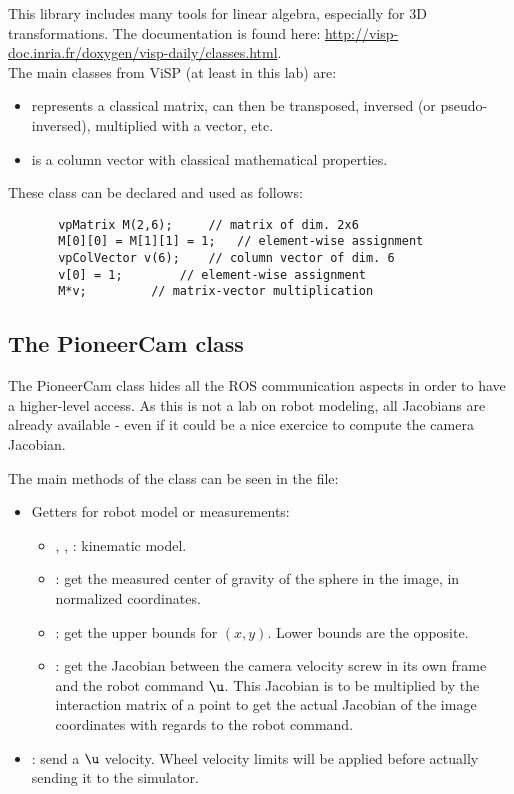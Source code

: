 \documentclass{ecnreport}
\begin{document}
This library includes many tools for linear algebra, especially for 3D transformations. 
The documentation is found here: \url{http://visp-doc.inria.fr/doxygen/visp-daily/classes.html}.\\
The main classes from ViSP (at least in this lab) are:
\begin{itemize}
\item {} represents a classical matrix, can then be transposed, inversed (or pseudo-inversed), multiplied with a vector, etc.
\item {} is a column vector with classical mathematical properties.
\end{itemize}
These class can be declared and used as follows:
\begin{center}\cppstyle
\begin{lstlisting}
       vpMatrix M(2,6); 	// matrix of dim. 2x6
       M[0][0] = M[1][1] = 1;	// element-wise assignment
       vpColVector v(6);	// column vector of dim. 6
       v[0] = 1;		// element-wise assignment
       M*v;			// matrix-vector multiplication
\end{lstlisting}
\end{center}

\subsection{The PioneerCam class}
\label{pioneer}
The PioneerCam class hides all the ROS communication aspects in order to have a higher-level access. As this is not a lab on robot modeling, all Jacobians are already 
available - even if it could be a nice exercice to compute the camera Jacobian. 

The main methods of the  class can be seen in the  file:
\begin{itemize}
 \item Getters for robot model or measurements:
 \begin{itemize}
  \item {}, ,  : kinematic model.
  \item {}: get the measured center of gravity of the sphere in the image, in normalized coordinates.
  \item {}: get the upper bounds for $(x,y)$. Lower bounds are the opposite.
  \item {}: get the Jacobian between the camera velocity screw in its own frame and the robot command $\u$. This Jacobian is to be multiplied
  by the interaction matrix of a point to get the actual Jacobian of the image coordinates with regards to the robot command.
 \end{itemize}
\item {}: send a $\u$ velocity. Wheel velocity limits will be applied before actually sending it to the simulator.
\end{itemize}
\end{document}
